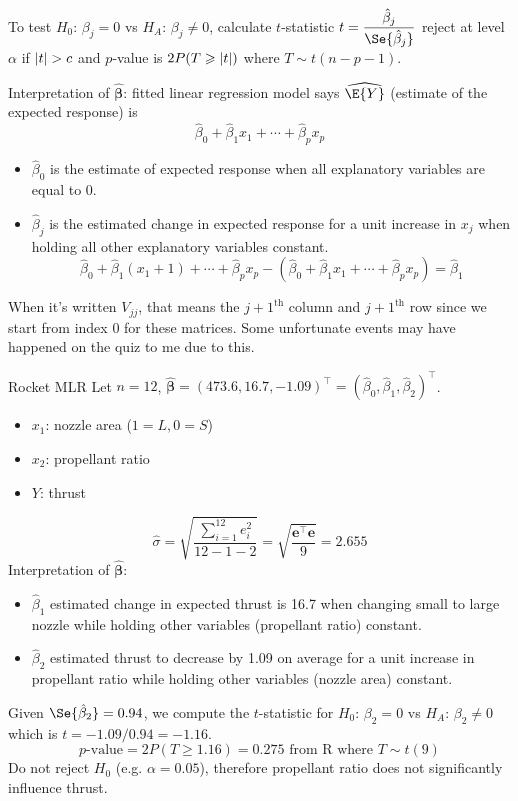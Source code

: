 To test $ H_0 $: $ \beta_j=0 $ vs $ H_A $: $ \beta_j\neq 0 $,
calculate $ t $-statistic
$ t=\dfrac{\hat{\beta}_j}{\Se{\hat{\beta}_j}} $
reject at level $ \alpha $ if $ \lvert t\rvert>c $ and
$ p $-value is $ 2P(T\geqslant \lvert t\rvert) $ where $ T \sim t(n-p-1) $.

Interpretation of $ \hat{\symbf{\beta}} $: fitted linear
regression model says $ \widehat{\E{Y}} $
(estimate of the expected response) is
\[ \hat{\beta}_0+\hat{\beta}_1x_1+\cdots+\hat{\beta}_p x_p \]
\begin{itemize}
    \item $ \hat{\beta}_0 $ is the estimate of expected response
          when all explanatory variables are equal to 0.
    \item $ \hat{\beta}_j $ is the estimated change
          in expected response for a unit increase in $ x_j $
          when holding all other explanatory variables constant.
          \[ \hat{\beta}_0+\hat{\beta}_1(x_1+1)+\cdots+\hat{\beta}_p x_p
              -(\hat{\beta}_0+\hat{\beta}_1 x_1+\cdots+\hat{\beta}_p x_p)=\hat{\beta}_1 \]
\end{itemize}

\begin{Remark}{}{}
    When it's written $ V_{jj} $, that means the $ j+1^{\text{th}} $
    column and $ j+1^{\text{th}} $ row since we start from index $ 0 $
    for these matrices. Some unfortunate events may have happened
    on the quiz to me due to this.
\end{Remark}

\begin{Example}{Rocket MLR}{}
    Let $ n=12 $, $ \hat{\symbf{\beta}}=(473.6, 16.7,-1.09)^\top
        =(\hat{\beta}_0,\hat{\beta}_1,\hat{\beta}_2)^\top $.
    \begin{itemize}
        \item $ x_1 $: nozzle area ($ 1 = L,0=S $)
        \item $ x_2 $: propellant ratio
        \item $ Y $: thrust
    \end{itemize}
    \[ \hat{\sigma}=\sqrt{\frac{\sum\limits_{i=1}^{12} e_i^2}{12-1-2}}=
        \sqrt{\frac{\symbf{e}^\top \symbf{e}}{9}}=
        2.655 \]
    Interpretation of $ \hat{\symbf{\beta}} $:
    \begin{itemize}
        \item $ \hat{\beta}_1 $ estimated change in expected thrust is 16.7
              when changing small to large nozzle while holding other variables
              (propellant ratio) constant.
        \item $ \hat{\beta}_2 $ estimated thrust to decrease by 1.09 on average
              for a unit increase in propellant ratio while holding other
              variables (nozzle area) constant.
    \end{itemize}
    Given $ \Se{\hat{\beta}_2}=0.94 $,
    we compute the $ t $-statistic for $ H_0 $: $ \beta_2=0 $ vs $ H_A $: $ \beta_2\neq 0 $
    which is $ t=-1.09/0.94=-1.16 $.
    \[ p\text{-value}=2P(T\geqslant 1.16)=0.275\text{ from R where } T \sim t(9)\]
    Do not reject $ H_0 $ (e.g. $ \alpha=0.05 $), therefore
    propellant ratio does not significantly influence thrust.
\end{Example}
